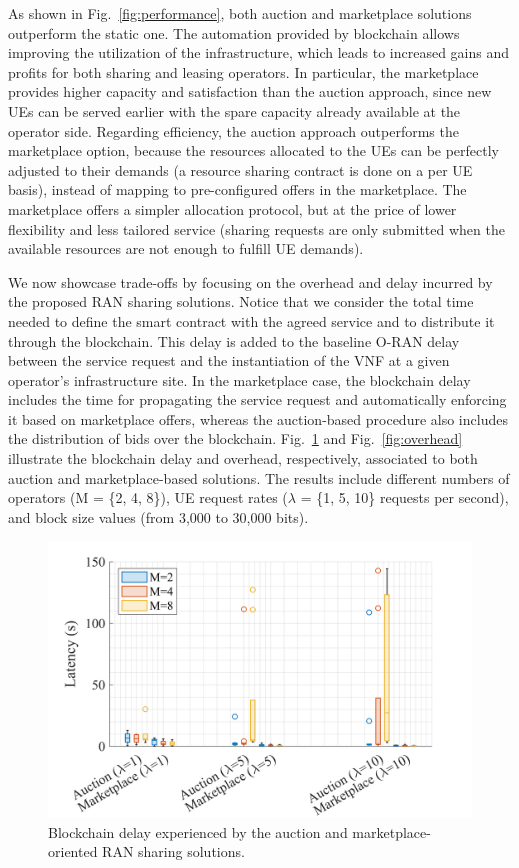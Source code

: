 \documentclass[journal]{IEEEtran}
\begin{document}
	As shown in Fig.~\ref{fig:performance}, both auction and marketplace solutions outperform the static one. The automation provided by blockchain allows improving the utilization of the infrastructure, which leads to increased gains and profits for both sharing and leasing operators. In particular, the marketplace provides higher capacity and satisfaction than the auction approach, since new UEs can be served earlier with the spare capacity already available at the operator side. Regarding efficiency, the auction approach outperforms the marketplace option, because the resources allocated to the UEs can be perfectly adjusted to their demands (a resource sharing contract is done on a per UE basis), instead of mapping to pre-configured offers in the marketplace. The marketplace offers a simpler allocation protocol, but at the price of lower flexibility and less tailored service (sharing requests are only submitted when the available resources are not enough to fulfill UE demands).
	
	We now showcase trade-offs by focusing on the overhead and delay incurred by the proposed RAN sharing solutions. Notice that we consider the total time needed to define the smart contract with the agreed service and to distribute it through the blockchain. This delay is added to the baseline O-RAN delay between the service request and the instantiation of the VNF at a given operator's infrastructure site. In the marketplace case, the blockchain delay includes the time for propagating the service request and automatically enforcing it based on marketplace offers, whereas the auction-based procedure also includes the distribution of bids over the blockchain. Fig.~\ref{fig:delay} and Fig.~\ref{fig:overhead} illustrate the blockchain delay and overhead, respectively, associated to both auction and marketplace-based solutions. The results include different numbers of operators (M = \{2, 4, 8\}), UE request rates ($\lambda$ = \{1, 5, 10\} requests per second), and block size values (from 3,000 to 30,000 bits).
	
	\begin{figure}[ht!]
		\centering
		\includegraphics[width=.85\linewidth]{delay_new.png}
		\caption{Blockchain delay experienced by the auction and marketplace-oriented RAN sharing solutions.}%
		\label{fig:delay}
	\end{figure}
	
\end{document}
